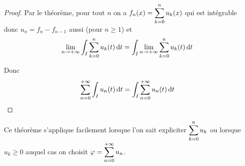 \begin{proof}
    Par le théorème, pour tout $n$ on a $\displaystyle f_n(x) = \sum_{k = 0}^{n } u_k(x)$ qui est intégrable
    donc $u_n = f_n - f_{n - 1}$ aussi (pour $n \geqslant 1$) et 
    $$\lim_{n \to + \infty} \int_I \sum_{k = 0}^{n } u_k(t) \,\mathrm{d}t = \int_I \lim_{n \to + \infty} \sum_{k = 0}^{n } u_k(t) \,\mathrm{d}t$$

    Donc $$\sum_{n = 0}^{+ \infty} \int_I u_n(t) \,\mathrm{d}t = \int_I \sum_{n = 0}^{+ \infty} u_n(t) \,\mathrm{d}t$$
\end{proof}

\begin{remarque}
    Ce théorème s'applique facilement lorsque l'on sait expliciter $\displaystyle \sum_{k = 0}^{n } u_k$ ou lorsque 
    $u_k \geqslant 0$ auquel cas on choisit $\displaystyle \varphi = \sum_{n = 0}^{+ \infty} u_n$. 
\end{remarque}


